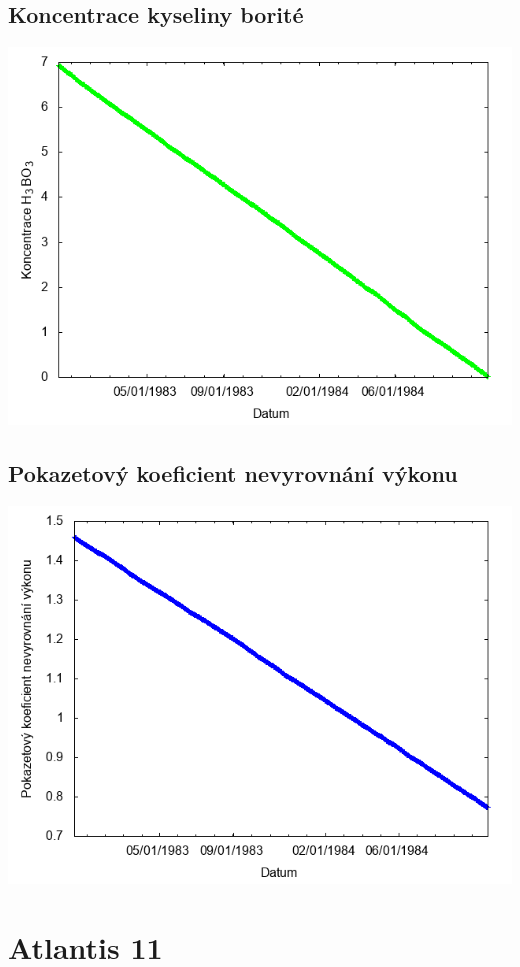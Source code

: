 \documentclass[a4paper,twoside,11pt]{article}
\begin{document}
\subsection*{Koncentrace kyseliny borité}
\begin{center}
\includegraphics[width=.8\textwidth]{graphs/Atlantis_10_bc.png}
\end{center}

\subsection*{Pokazetový koeficient nevyrovnání výkonu}
\begin{center}
\includegraphics[width=.8\textwidth]{graphs/Atlantis_10_fha.png}
\end{center}

\newpage
\section*{Atlantis 11}
\end{document}
